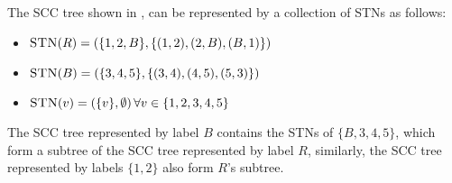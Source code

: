 The SCC tree shown in \figureref{\ref{fig:figure_with_subfigures}}, can be represented by a collection of STNs as follows:
\begin{itemize}
    \item $\text{\textsc{STN}}(R)=(\{1,2,B\}, \{(1,2), (2,B), (B,1)\})$
    \item $\text{\textsc{STN}}(B)=(\{3,4,5\}, \{(3,4), (4,5), (5,3)\})$
    \item $\text{\textsc{STN}}(v)=\left(\{v\}, \emptyset\right) \forall v \in \{1,2,3,4,5\}$
\end{itemize}
The SCC tree represented by label $B$ contains the STNs of $\{B,3,4,5\}$, which form a subtree of the SCC tree represented by label $R$,
similarly, the SCC tree represented by labels $\{1,2\}$ also form $R$'s subtree.